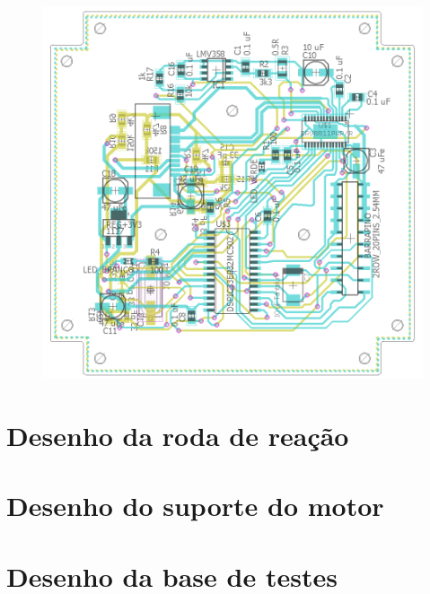 \documentclass[
	12pt,				%
	openany,			%
	twoside,			%
	a4paper,			%
	english,			%
	french,				%
	spanish,			%
	brazil,				%
	oldfontcommands
	]{abntex2}
\begin{document}
\begin{apendicesenv}
\begin{figure}[th]
	\centering
	\includegraphics[width=1\linewidth]{./figs/Placa_motores}
\end{figure}

\label{ap:PMotor}

\chapter{Desenho da roda de reação}



\label{ap:RW}

\chapter{Desenho do suporte do motor}



\label{ap:MS}

\chapter{Desenho da base de testes}







\label{ap:TB}

\end{apendicesenv}
\end{document}
